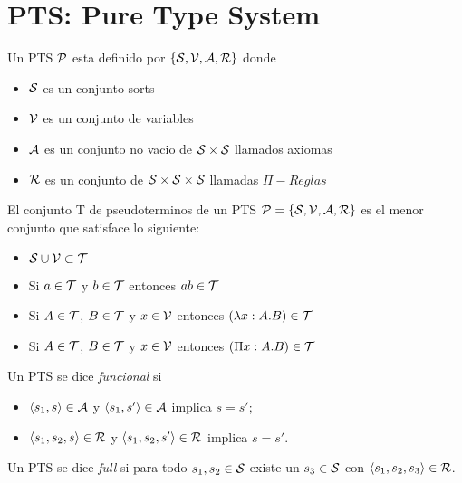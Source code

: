 \section{PTS: Pure Type System}

\begin{definition}[PTS]
Un PTS $\mathcal{P} $ esta definido por $\{ \mathcal{S}, \mathcal{V}, \mathcal{A}, \mathcal{R}\}$ donde

\begin{itemize}
    \item{$\mathcal{S}$} es un conjunto sorts
    \item{$\mathcal{V}$} es un conjunto de variables
    \item{$\mathcal{A}$} es un conjunto no vacio de $\mathcal{S}\times\mathcal{S}$ llamados axiomas 
    \item{$\mathcal{R}$} es un conjunto de $\mathcal{S}\times\mathcal{S}\times\mathcal{S}$ llamadas $\Pi-Reglas$ 
\end{itemize}
\end{definition}

\begin{definition}[Pseudotérminos]
El conjunto T de pseudoterminos de un PTS $ \mathcal{P} = \{ \mathcal{S}, \mathcal{V}, \mathcal{A}, \mathcal{R}\}$ 
es el menor conjunto que satisface lo siguiente:
\begin{itemize}
    \item{} $\mathcal{S} \cup \mathcal{V} \subset \mathcal{T}$
    \item{} Si $a \in \mathcal{T}$ y $b \in \mathcal{T}$ entonces $ab \in\mathcal{T}$
    \item{} Si $A \in \mathcal{T}$,  $B \in \mathcal{T}$  y $x \in \mathcal{V}$  entonces $(\lambda x:A.B) \in\mathcal{T}$
    \item{} Si $A \in \mathcal{T}$,  $B \in \mathcal{T}$  y $x \in \mathcal{V}$  entonces $(\Pi x:A.B) \in\mathcal{T}$
\end{itemize}
\end{definition}

\begin{definition}
Un PTS se dice \emph{funcional} si
\begin{itemize}
\item $\langle s_1, s \rangle \in \mathcal{A}$ y $\langle s_1, s'\rangle \in \mathcal{A}$ implica $s = s'$;
\item $\langle s_1, s_2, s\rangle \in \mathcal{R}$ y $\langle s_1, s_2, s' \rangle \in \mathcal{R}$ implica $s = s'$.
\end{itemize}
\end{definition}
\begin{definition}
Un PTS se dice \emph{full} si para todo $s_1, s_2 \in \mathcal{S}$
existe un $s_3 \in \mathcal{S}$ con $\langle s_1, s_2, s_3 \rangle \in \mathcal{R}$.
\end{definition}

